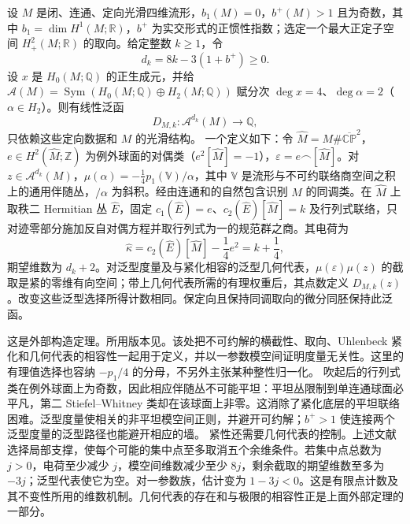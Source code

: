 \begin{theorem}\label{g3:thm:B-donaldson-invariant}
 设 \(M\) 是闭、连通、定向光滑四维流形，\(b_1(M)=0\)，\(b^+(M)>1\) 且为奇数，其中 \(b_1=\dim H^1(M;\mathbb R)\)，\(b^+\) 为实交形式的正惯性指数；选定一个最大正定子空间 \(H^2_+(M;\mathbb R)\) 的取向。给定整数 \(k\ge1\)，令
 \[
 d_k=8k-3(1+b^+)\ge0.
 \]
 设 \(x\) 是 \(H_0(M;\mathbb Q)\) 的正生成元，并给
 \(\mathcal A(M)=\operatorname{Sym}(H_0(M;\mathbb Q)\oplus H_2(M;\mathbb Q))\)
 赋分次 \(\deg x=4\)、\(\deg\alpha=2\)（\(\alpha\in H_2\)）。则有线性泛函
 \[
 D_{M,k}:\mathcal A^{d_k}(M)\longrightarrow\mathbb Q,
 \]
 只依赖这些定向数据和 \(M\) 的光滑结构。
 \ProseParagraphBreak
 一个定义如下：令 \(\widehat M=M\#\overline{\mathbb{CP}}^2\)，\(e\in H^2(\widehat M;\mathbb Z)\) 为例外球面的对偶类（\(e^2[\widehat M]=-1\)），\(\varepsilon=e\frown[\widehat M]\)。对 \(z\in\mathcal A^{d_k}(M)\)，\(\mu(\alpha)=-\tfrac14p_1(\mathbb V)/\alpha\)，其中 \(\mathbb V\) 是流形与不可约联络商空间之积上的通用伴随丛，\(/\alpha\) 为斜积。经由连通和的自然包含识别 \(M\) 的同调类。在 \(\widehat M\) 上取秩二 Hermitian 丛 \(\widehat E\)，固定
 \(c_1(\widehat E)=e\)、\(c_2(\widehat E)[\widehat M]=k\)
 及行列式联络，只对迹零部分施加反自对偶方程并取行列式为一的规范群之商。其电荷为
 \[
 \widehat\kappa=c_2(\widehat E)[\widehat M]-\frac14e^2=k+\frac14,
 \]
 期望维数为 \(d_k+2\)。对泛型度量及与紧化相容的泛型几何代表，\(\mu(\varepsilon)\mu(z)\) 的截取是紧的零维有向空间；带上几何代表所需的有理权重后，其点数定义 \(D_{M,k}(z)\)。改变这些泛型选择所得计数相同。保定向且保持同调取向的微分同胚保持此泛函。
\end{theorem}

这是外部构造定理。所用版本见\cite[第2节(i)、(ii)，定义2.1、推论2.5及式(2.7)--(2.9)前后的构造，作者稿第10--20页]{KronheimerMrowka1995EmbeddedSurfaces}。该处把不可约解的横截性、取向、Uhlenbeck 紧化和几何代表的相容性一起用于定义，并以一参数模空间证明度量无关性。这里的有理值选择也容纳 \(-p_1/4\) 的分母，不另外主张某种整性归一化。
\ProseParagraphBreak
吹起后的行列式类在例外球面上为奇数，因此相应伴随丛不可能平坦：平坦丛限制到单连通球面必平凡，第二 Stiefel--Whitney 类却在该球面上非零。这消除了紧化底层的平坦联络困难。泛型度量使相关的非平坦模空间正则，并避开可约解；\(b^+>1\) 使连接两个泛型度量的泛型路径也能避开相应的墙。
\ProseParagraphBreak
紧性还需要几何代表的控制。上述文献选择局部支撑，使每个可能的集中点至多取消五个余维条件。若集中点总数为 \(j>0\)，电荷至少减少 \(j\)，模空间维数减少至少 \(8j\)，剩余截取的期望维数至多为 \(-3j\)；泛型代表使它为空。对一参数族，估计变为 \(1-3j<0\)。这是有限点计数及其不变性所用的维数机制。几何代表的存在和与极限的相容性正是上面外部定理的一部分。

